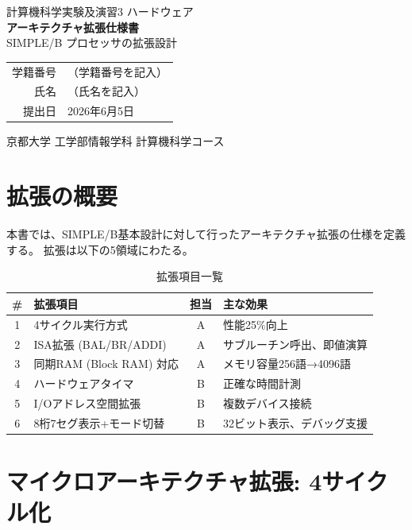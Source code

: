 \documentclass[a4paper,11pt]{ltjsarticle}
\begin{document}
\begin{titlepage}
\centering
\vspace*{3cm}
{\LARGE 計算機科学実験及演習3 ハードウェア}\\[1cm]
{\Huge\bfseries アーキテクチャ拡張仕様書}\\[0.5cm]
{\LARGE SIMPLE/B プロセッサの拡張設計}\\[3cm]
\begin{tabular}{rl}
学籍番号 & （学籍番号を記入） \\[0.5em]
氏名     & （氏名を記入） \\[0.5em]
提出日   & 2026年6月5日 \\
\end{tabular}
\vfill
京都大学 工学部情報学科 計算機科学コース
\end{titlepage}

\tableofcontents
\clearpage


\section{拡張の概要}

本書では、SIMPLE/B基本設計に対して行ったアーキテクチャ拡張の仕様を定義する。
拡張は以下の5領域にわたる。

\begin{table}[h]
\centering
\caption{拡張項目一覧}
\begin{tabular}{clcl}
\toprule
\# & 拡張項目 & 担当 & 主な効果 \\
\midrule
1 & 4サイクル実行方式 & A & 性能25\%向上 \\
2 & ISA拡張 (BAL/BR/ADDI) & A & サブルーチン呼出、即値演算 \\
3 & 同期RAM (Block RAM) 対応 & A & メモリ容量256語→4096語 \\
4 & ハードウェアタイマ & B & 正確な時間計測 \\
5 & I/Oアドレス空間拡張 & B & 複数デバイス接続 \\
6 & 8桁7セグ表示+モード切替 & B & 32ビット表示、デバッグ支援 \\
\bottomrule
\end{tabular}
\end{table}


\section{マイクロアーキテクチャ拡張: 4サイクル化}
\end{document}

